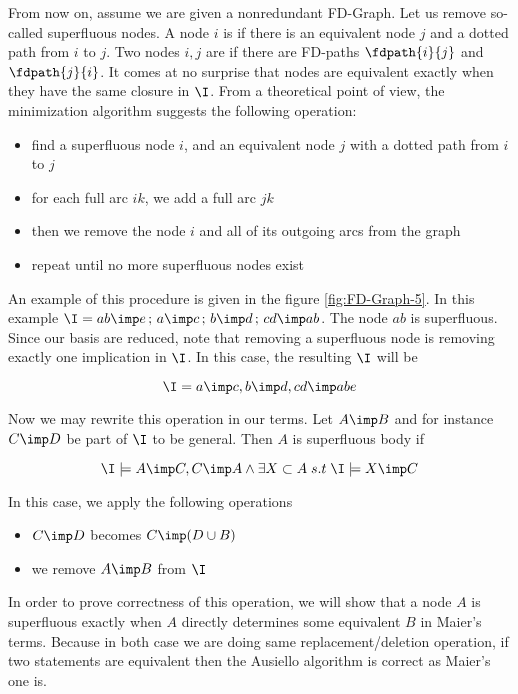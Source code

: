 From now on, assume we are given a nonredundant FD-Graph. Let us remove so-called superfluous nodes. A node $i$ is  if there is an equivalent node $j$ and a dotted path from $i$ to $j$. Two nodes $i, j$ are  if there are FD-paths $\fdpath{i}{j}$ and $\fdpath{j}{i}$.
It comes at no surprise that nodes are equivalent exactly when they have the
same closure in $\I$. From a theoretical point of view, the minimization algorithm suggests the following operation:
\begin{itemize}
	\item find a superfluous node $i$, and an equivalent node $j$ with a dotted
	path from $i$ to $j$
	\item for each full arc $ik$, we add a full arc $jk$
	\item then we remove the node $i$ and all of its outgoing arcs from the 
	graph
	\item repeat until no more superfluous nodes exist
\end{itemize}
\noindent An example of this procedure is given in the figure
\ref{fig:FD-Graph-5}. In this example $\I = {ab \imp e \, ; \, a \imp c
	\, ; \, b \imp d \, ; \, cd \imp ab}$. The node $ab$ is superfluous. Since 
our
basis are reduced, note that removing a superfluous node is removing exactly 
one implication in $\I$. In this case, the resulting $\I$ will be

\[ \I = {a \imp c, b \imp d, cd \imp abe} \] 


\begin{figure}[ht]

\end{figure}


\noindent Now we may rewrite this operation in our terms. Let $A \imp B$ and 
for instance $C \imp D$ be part of $\I$ to be general. Then $A$ is superfluous
body if

\[ \I \models A \imp C, C \imp A \land \exists X \subset A \; s.t \;
\I \models X \imp C \]

\noindent In this case, we apply the following operations
\begin{itemize}
	\item $C \imp D$ becomes $C \imp (D \cup B)$
	\item we remove $A \imp B$ from $\I$
\end{itemize}

\noindent In order to prove correctness of this operation, we will show that
a node $A$ is superfluous exactly when $A$ directly determines some equivalent
$B$ in Maier's terms. Because in both case we are doing same replacement/deletion operation, if two statements are equivalent then the Ausiello algorithm is correct as Maier's one is.

